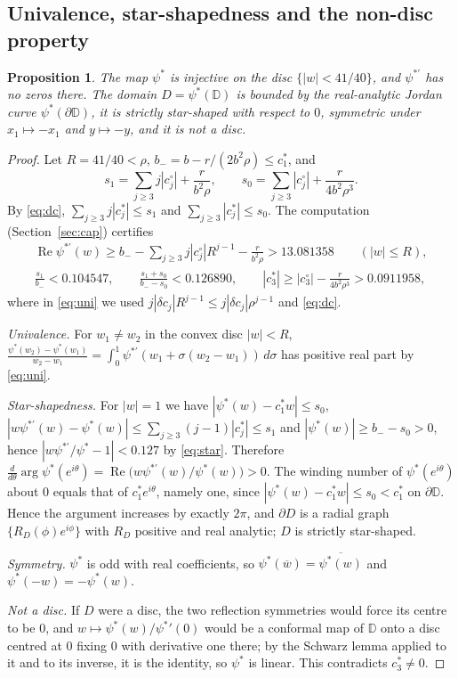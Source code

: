 \documentclass[11pt]{amsart}
\newtheorem{proposition}[theorem]{Proposition}
\theoremstyle{definition}
\theoremstyle{remark}
\numberwithin{equation}{section}
\newcommand{\D}{\mathbb{D}}
\newcommand{\bw}{\overline{w}}
\DeclareMathOperator{\re}{Re}
\begin{document}
\subsection{Univalence, star-shapedness and the non-disc property}

\begin{proposition}\label{prop:geometry}
The map $\psi^*$ is injective on the disc $\{|w|<41/40\}$, and $\psi^{*\prime}$ has no zeros there. The domain $D=\psi^*(\D)$ is bounded by the real-analytic Jordan curve $\psi^*(\partial\D)$, it is strictly star-shaped with respect to $0$, symmetric under $x_1\mapsto-x_1$ and $y\mapsto-y$, and it is not a disc.
\end{proposition}

\begin{proof}
Let $R=41/40<\rho$, $b_-=b-r/(2b^2\rho)\leq c^*_1$, and
\[
s_1=\sum_{j\geq3}j|c^\circ_j|+\frac r{b^2\rho},\qquad s_0=\sum_{j\geq3}|c^\circ_j|+\frac r{4b^2\rho^3}.
\]
By \eqref{eq:dc}, $\sum_{j\geq3}j|c^*_j|\leq s_1$ and $\sum_{j\geq3}|c_j^*|\leq s_0$. The computation (Section~\ref{sec:cap}) certifies
\begin{gather}
\re\psi^{*\prime}(w)\geq b_--\sum_{j\geq3}j|c^\circ_j|R^{j-1}-\frac r{b^2\rho}>13.081358\qquad(|w|\leq R),\label{eq:uni}\\
\frac{s_1}{b_-}<0.104547,\qquad \frac{s_1+s_0}{b_--s_0}<0.126890,\qquad |c^*_3|\geq|c^\circ_3|-\frac r{4b^2\rho^3}>0.0911958,\label{eq:star}
\end{gather}
where in \eqref{eq:uni} we used $j|\delta c_j|R^{j-1}\leq j|\delta c_j|\rho^{j-1}$ and \eqref{eq:dc}.

\emph{Univalence.} For $w_1\neq w_2$ in the convex disc $|w|<R$, $\frac{\psi^*(w_2)-\psi^*(w_1)}{w_2-w_1}=\int_0^1\psi^{*\prime}(w_1+\sigma(w_2-w_1))\,d\sigma$ has positive real part by \eqref{eq:uni}.

\emph{Star-shapedness.} For $|w|=1$ we have $|\psi^*(w)-c_1^*w|\leq s_0$, $|w\psi^{*\prime}(w)-\psi^*(w)|\leq\sum_{j\geq3}(j-1)|c_j^*|\leq s_1$ and $|\psi^*(w)|\geq b_--s_0>0$, hence $|w\psi^{*\prime}/\psi^*-1|<0.127$ by \eqref{eq:star}. Therefore $\frac{d}{d\theta}\arg\psi^*(e^{i\theta})=\re\big(w\psi^{*\prime}(w)/\psi^*(w)\big)>0$. The winding number of $\psi^*(e^{i\theta})$ about $0$ equals that of $c_1^*e^{i\theta}$, namely one, since $|\psi^*(w)-c_1^*w|\leq s_0<c_1^*$ on $\partial\D$. Hence the argument increases by exactly $2\pi$, and $\partial D$ is a radial graph $\{R_D(\phi)e^{i\phi}\}$ with $R_D$ positive and real analytic; $D$ is strictly star-shaped.

\emph{Symmetry.} $\psi^*$ is odd with real coefficients, so $\psi^*(\bw)=\overline{\psi^*(w)}$ and $\psi^*(-w)=-\psi^*(w)$.

\emph{Not a disc.} If $D$ were a disc, the two reflection symmetries would force its centre to be $0$, and $w\mapsto\psi^*(w)/\psi^*{}'(0)$ would be a conformal map of $\D$ onto a disc centred at $0$ fixing $0$ with derivative one there; by the Schwarz lemma applied to it and to its inverse, it is the identity, so $\psi^*$ is linear. This contradicts $c^*_3\neq0$.
\end{proof}
\end{document}

